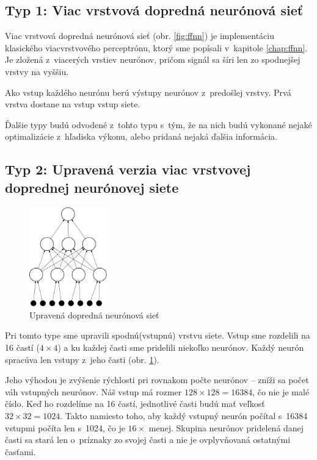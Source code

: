 \subsection{Typ 1: Viac vrstvová dopredná neurónová sieť}

Viac vrstvová dopredná neurónová sieť (obr. \ref{fig:ffnn}) je implementáciu klasického viacvrstvového perceptrónu, ktorý sme popísali v~kapitole \ref{chap:ffnn}. Je zložená z~viacerých vrstiev neurónov, pričom signál sa šíri len zo spodnejšej vrstvy na vyššiu.

Ako vstup každého neurónu berú výstupy neurónov z~predošlej vrstvy. Prvá vrstva dostane na vstup vstup siete. 

Ďalšie typy budú odvodené z~tohto typu s~tým, že na nich budú vykonané nejaké optimalizácie z~hľadiska výkonu, alebo pridaná nejaká ďalšia informácia.

\subsection{Typ 2: Upravená verzia viac vrstvovej doprednej neurónovej siete}

\begin{figure}[h]
  \begin{center}
    \includegraphics[width=0.3\textwidth]{images/dffnn}
  \end{center}
  \caption{Upravená dopredná neurónová sieť}
  \label{fig:dffnn}
\end{figure}

Pri tomto type sme upravili spodnú(vstupnú) vrstvu siete. Vstup sme rozdelili na 16 častí ($4\times 4$) a ku každej časti sme pridelili niekoľko neurónov.
Každý neurón spracúva len vstupy z~jeho časti (obr. \ref{fig:dffnn}). 

Jeho výhodou je zvýšenie rýchlosti pri rovnakom počte neurónov -- zníži sa počet váh vstupných neurónov. Náš vstup má rozmer $128\times 128 = 16384$, čo nie je malé číslo. Keď ho rozdelíme na 16 častí, jednotlivé časti budú mať veľkosť $32\times 32 = 1024$. Takto namiesto toho, aby každý vstupný neurón počítal s~16384 vstupmi počíta len s~1024, čo je $16\times$ menej. Skupina neurónov pridelená danej časti sa stará len o~príznaky zo svojej časti a nie je ovplyvňovaná ostatnými časťami. 

